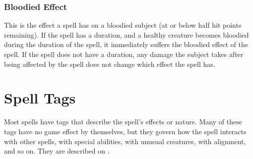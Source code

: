 \subsubsection{Bloodied Effect}
This is the effect a spell has on a bloodied subject (at or below half hit points remaining). If the spell has a duration, and a healthy creature becomes bloodied during the duration of the spell, it immediately suffers the bloodied effect of the spell. If the spell does not have a duration, any damage the subject takes after being affected by the spell does not change which effect the spell has.


\section{Spell Tags}\label{Spell Tags}

Most spells have tags that describe the spell's effects or nature. Many of these tags have no game effect by themselves, but they govern how the spell interacts with other spells, with special abilities, with unusual creatures, with alignment, and so on. They are described on .


